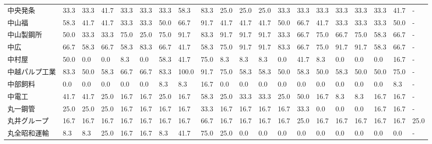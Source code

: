 \documentclass[a4paper，11pt]{jsarticle}
\begin{document}
\begin{longtable}[c]{lp{3mm}p{3mm}p{3mm}p{3mm}p{3mm}p{3mm}p{3mm}p{3mm}p{3mm}p{3mm}p{3mm}p{3mm}p{3mm}p{3mm}p{3mm}p{3mm}p{3mm}p{3mm}p{3mm}}
中央発条            &   33.3 &   33.3 &      41.7 &      33.3 &       33.3 &   33.3 &   58.3 &   83.3 &    25.0 &    25.0 &   25.0 &  33.3 &   33.3 &    33.3 &    33.3 &  33.3 &  33.3 &  41.7 &     - \\
中山福             &   58.3 &   41.7 &      41.7 &      33.3 &       33.3 &   50.0 &   66.7 &   91.7 &    41.7 &    41.7 &   41.7 &  50.0 &   66.7 &    41.7 &    33.3 &  33.3 &  33.3 &  50.0 &     - \\
中山製鋼所           &   50.0 &   33.3 &      33.3 &      75.0 &       25.0 &   75.0 &   91.7 &   83.3 &    91.7 &    91.7 &   91.7 &  33.3 &   66.7 &    75.0 &    66.7 &  75.0 &  58.3 &  66.7 &     - \\
中広              &   66.7 &   58.3 &      66.7 &      58.3 &       83.3 &   66.7 &   41.7 &   58.3 &    75.0 &    91.7 &   91.7 &  83.3 &   66.7 &    75.0 &    91.7 &  91.7 &  58.3 &  66.7 &     - \\
中村屋             &   50.0 &    0.0 &       0.0 &       8.3 &        0.0 &   58.3 &   41.7 &   75.0 &     8.3 &     8.3 &    8.3 &   0.0 &   41.7 &     8.3 &     0.0 &   0.0 &   0.0 &  16.7 &     - \\
中越パルプ工業         &   83.3 &   50.0 &      58.3 &      66.7 &       66.7 &   83.3 &  100.0 &   91.7 &    75.0 &    58.3 &   58.3 &  50.0 &   58.3 &    50.0 &    58.3 &  50.0 &  50.0 &  75.0 &     - \\
中部飼料            &    0.0 &    0.0 &       0.0 &       0.0 &        0.0 &    8.3 &    8.3 &   16.7 &     0.0 &     0.0 &    0.0 &   0.0 &    0.0 &     0.0 &     0.0 &   0.0 &   0.0 &   8.3 &     - \\
中電工             &   41.7 &   41.7 &      25.0 &      16.7 &       16.7 &   25.0 &   16.7 &   58.3 &    25.0 &    33.3 &   33.3 &  25.0 &   50.0 &    16.7 &     8.3 &   8.3 &  16.7 &  16.7 &     - \\
丸一鋼管            &   25.0 &   25.0 &      25.0 &      16.7 &       16.7 &   16.7 &   16.7 &   33.3 &    16.7 &    16.7 &   16.7 &  16.7 &   33.3 &     0.0 &     0.0 &   0.0 &  16.7 &  16.7 &     - \\
丸井グループ          &   16.7 &   16.7 &      16.7 &      16.7 &       16.7 &   16.7 &   16.7 &   66.7 &    16.7 &    16.7 &   16.7 &  16.7 &   25.0 &    16.7 &    16.7 &  16.7 &  16.7 &  16.7 &  25.0 \\
丸全昭和運輸          &    8.3 &    8.3 &      25.0 &      16.7 &       16.7 &    8.3 &   41.7 &   75.0 &    25.0 &     0.0 &    0.0 &   0.0 &    0.0 &     0.0 &     0.0 &   0.0 &   0.0 &   0.0 &     - \\

\end{longtable}
\end{document}
